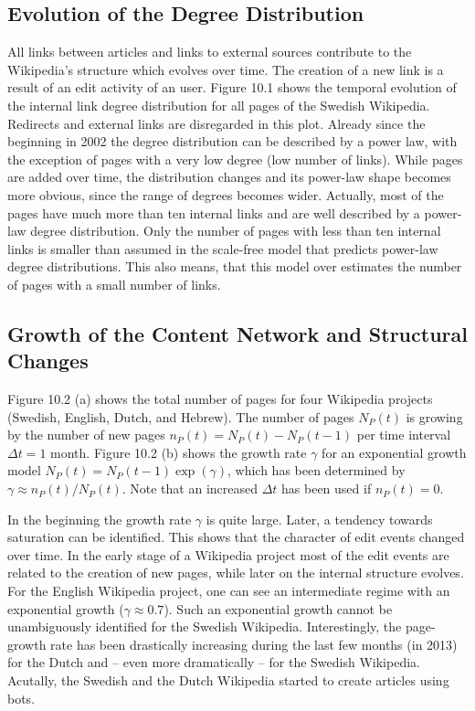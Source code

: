 \documentclass[a4paper,10pt]{scrbook}
\begin{document}
\subsection{Evolution of the Degree Distribution}

\label{ext.fig.EvolutionOfDegreeDistribution} 


All links between articles and links to external sources contribute to the Wikipedia's structure which evolves over time.  The creation of a 
new link is a result of an edit activity of an user.  Figure 10.1 shows the temporal evolution of
the internal link degree distribution for all pages of the Swedish Wikipedia.  Redirects and 
external links are disregarded in this plot.  Already since the beginning in 2002 the degree 
distribution can be described by a power law, with the exception of pages with a very low 
degree (low number of links).  While pages are added over time, the distribution changes and its 
power-law shape becomes more obvious, since the range of degrees becomes wider.  Actually, most 
of the pages have much more than ten internal links and are well described by a power-law
degree distribution.  Only the number of pages with less than ten internal links is smaller 
than assumed in the scale-free model that predicts power-law degree distributions. This also means, that this model over estimates the number of pages with a small number of links. 

\subsection{Growth of the Content Network and Structural Changes}


Figure 10.2 (a) shows the total number of pages for four Wikipedia projects (Swedish, English, 
Dutch, and Hebrew).  The number of pages $N_P(t)$ is growing by the number of new pages 
$n_P(t) = N_P(t) - N_P(t-1)$ per time interval $\Delta t = 1$ month.  Figure 10.2 (b) shows the 
growth rate $\gamma$ for an exponential growth model $N_P(t) = N_P(t-1) \exp(\gamma)$, 
which has been determined by $\gamma \approx n_P(t)/N_P(t)$.  Note that an increased $\Delta t$
has been used if $n_P(t)=0$.

\label{ext.fig.GrowthRate4Languages} 


In the beginning the growth rate $\gamma$ is quite large.  Later, a tendency towards saturation 
can be identified.  This shows that the character of edit events changed over time.  In the 
early stage of a Wikipedia project most of the edit events are related to the creation of new 
pages, while later on the internal structure evolves.  For the English Wikipedia project, one 
can see an intermediate regime with an exponential growth ($\gamma \approx 0.7$).  Such an 
exponential growth cannot be unambiguously identified for the Swedish Wikipedia.  Interestingly,
the page-growth rate has been drastically increasing during the last few months (in 2013) for 
the Dutch and -- even more dramatically -- for the Swedish Wikipedia.  Acutally, the Swedish 
and the Dutch Wikipedia started to create articles using bots. 
\end{document}
